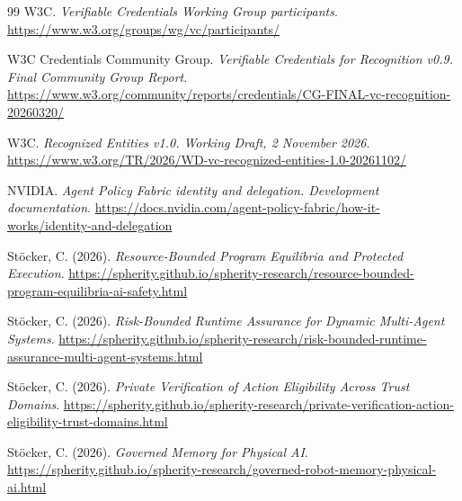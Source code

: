 \begin{thebibliography}{99}
W3C. \textit{Verifiable Credentials Working Group participants}.
\url{https://www.w3.org/groups/wg/vc/participants/}

W3C Credentials Community Group. \textit{Verifiable Credentials for Recognition v0.9. Final Community Group Report}.
\url{https://www.w3.org/community/reports/credentials/CG-FINAL-vc-recognition-20260320/}

W3C. \textit{Recognized Entities v1.0. Working Draft, 2 November 2026}.
\url{https://www.w3.org/TR/2026/WD-vc-recognized-entities-1.0-20261102/}

NVIDIA. \textit{Agent Policy Fabric identity and delegation. Development documentation}.
\url{https://docs.nvidia.com/agent-policy-fabric/how-it-works/identity-and-delegation}

Stöcker, C. (2026). \textit{Resource-Bounded Program Equilibria and Protected Execution}.
\url{https://spherity.github.io/spherity-research/resource-bounded-program-equilibria-ai-safety.html}

Stöcker, C. (2026). \textit{Risk-Bounded Runtime Assurance for Dynamic Multi-Agent Systems}.
\url{https://spherity.github.io/spherity-research/risk-bounded-runtime-assurance-multi-agent-systems.html}

Stöcker, C. (2026). \textit{Private Verification of Action Eligibility Across Trust Domains}.
\url{https://spherity.github.io/spherity-research/private-verification-action-eligibility-trust-domains.html}

Stöcker, C. (2026). \textit{Governed Memory for Physical AI}.
\url{https://spherity.github.io/spherity-research/governed-robot-memory-physical-ai.html}

\end{thebibliography}
